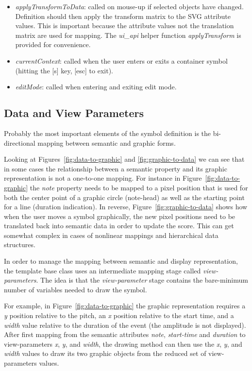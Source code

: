 \documentclass{article}
\def\uiapi{\textit{ui\_api}\xspace}
\begin{document}
\begin{itemize}
\item \textit{applyTransformToData}: called on mouse-up if selected objects have changed. Definition should then apply the transform matrix to the SVG attribute values. This is important because the attribute values not the translation matrix are used for mapping. The \uiapi helper function \textit{applyTransform} is provided for convenience.

\item \textit{currentContext}: called when the user enters or exits a container symbol (hitting the [s] key, [esc] to exit).

\item \textit{editMode}: called when entering and exiting edit mode.
\end{itemize}

\subsection{Data and View Parameters}\label{sec:view-parameters}

Probably the most important elements of the symbol definition is the bi-directional mapping between semantic and graphic forms.
 
Looking at Figures~\ref{fig:data-to-graphic} and \ref{fig:graphic-to-data} we can see that in some cases the relationship between a semantic property and its graphic representation is not a one-to-one mapping.
For instance in Figure~\ref{fig:data-to-graphic} the \textit{note} property needs to be mapped to a pixel position that is used for both the center point of a graphic circle (note-head) as well as the starting point for a line (duration indication).
In reverse, Figure~\ref{fig:graphic-to-data} shows how when the user moves a symbol graphically, the new pixel positions need to be translated back into semantic data in order to update the score.
This can get somewhat complex in cases of nonlinear mappings and hierarchical data structures.

In order to manage the mapping between semantic and display representation, the template base class uses an intermediate mapping stage called \textit{view-parameters}.
The idea is that the \textit{view-parameter} stage contains the bare-minimum number of variables needed to draw the symbol.

For example, in Figure~\ref{fig:data-to-graphic} the graphic representation requires a \textit{y} position relative to the pitch, an \textit{x} position relative to the start time, and a \textit{width} value relative to the duration of the event (the amplitude is not displayed).
After first mapping from the semantic attributes \textit{note}, \textit{start-time} and \textit{duration} to view-parameters \textit{x}, \textit{y}, and \textit{width}, the drawing method can then use the \textit{x}, \textit{y}, and \textit{width} values to draw its two graphic objects from the reduced set of view-parameters values.
\end{document}
